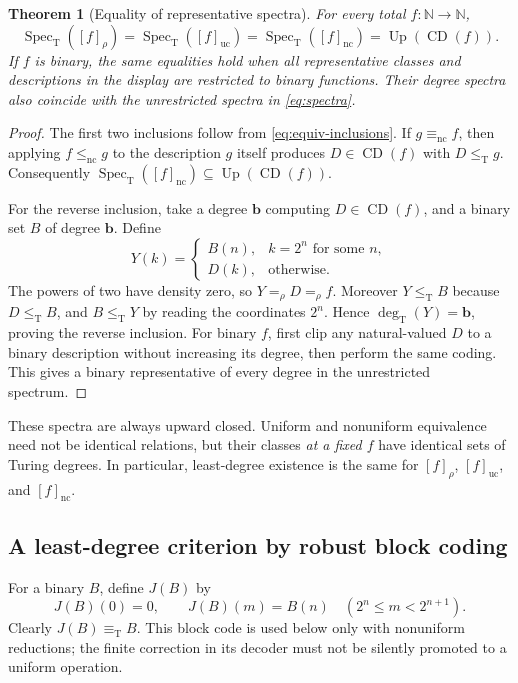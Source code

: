 \documentclass[11pt,a4paper]{article}
\newcommand{\N}{\mathbb N}
\newcommand{\leT}{\leq_{\mathrm T}}
\newcommand{\eqT}{\equiv_{\mathrm T}}
\newcommand{\degT}{\operatorname{deg}_{\mathrm T}}
\newcommand{\Spec}{\operatorname{Spec}_{\mathrm T}}
\newcommand{\Up}{\operatorname{Up}}
\newcommand{\CD}{\operatorname{CD}}
\newcommand{\nc}{\mathrm{nc}}
\newcommand{\uc}{\mathrm{uc}}
\newtheorem{theorem}{Theorem}[section]
\theoremstyle{definition}\newtheorem{definition}[theorem]{Definition}
\theoremstyle{remark}\newtheorem{remark}[theorem]{Remark}
\begin{document}
\begin{theorem}[Equality of representative spectra]\label{thm:spectra}
For every total $f:\N\to\N$,
\begin{equation}\label{eq:spectra}
 \Spec([f]_{\rho})
   =\Spec([f]_{\uc})
   =\Spec([f]_{\nc})
   =\Up(\CD(f)).
\end{equation}
If $f$ is binary, the same equalities hold when all representative classes and
descriptions in the display are restricted to binary functions. Their degree
spectra also coincide with the unrestricted spectra in \eqref{eq:spectra}.
\end{theorem}
\begin{proof}
The first two inclusions follow from \eqref{eq:equiv-inclusions}.
If $g\equiv_{\nc}f$, then applying $f\leq_{\nc}g$ to the description $g$
itself produces $D\in\CD(f)$ with $D\leT g$. Consequently
$\Spec([f]_{\nc})\subseteq\Up(\CD(f))$.

For the reverse inclusion, take a degree $\mathbf b$ computing
$D\in\CD(f)$, and a binary set $B$ of degree $\mathbf b$. Define
\[
 Y(k)=\begin{cases}
        B(n),&k=2^n\text{ for some }n,\\
        D(k),&\text{otherwise}.
       \end{cases}
\]
The powers of two have density zero, so $Y=_{\rho}D=_{\rho}f$.
Moreover $Y\leT B$ because $D\leT B$, and $B\leT Y$ by reading the
coordinates $2^n$. Hence $\degT(Y)=\mathbf b$, proving the reverse inclusion.
For binary $f$, first clip any natural-valued $D$ to a binary description
without increasing its degree, then perform the same coding. This gives a
binary representative of every degree in the unrestricted spectrum.
\end{proof}

These spectra are always upward closed. Uniform and nonuniform equivalence
need not be identical relations, but their classes \emph{at a fixed $f$} have
identical sets of Turing degrees. In particular, least-degree existence is
the same for $[f]_{\rho}$, $[f]_{\uc}$, and $[f]_{\nc}$.

\subsection{A least-degree criterion by robust block coding}
For a binary $B$, define $J(B)$ by
\begin{equation}\label{eq:J}
 J(B)(0)=0,\qquad J(B)(m)=B(n)\quad(2^n\le m<2^{n+1}).
\end{equation}
Clearly $J(B)\eqT B$. This block code is used below only with nonuniform
reductions; the finite correction in its decoder must not be silently
promoted to a uniform operation.
\end{document}
